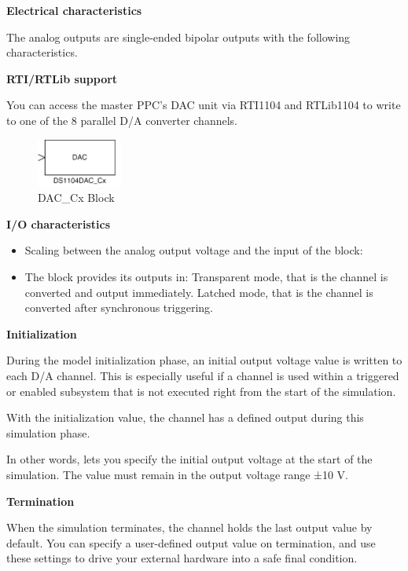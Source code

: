 \noindent \textbf{Electrical characteristics}\par
The analog outputs are single-ended bipolar outputs with the following characteristics.


\noindent \textbf{RTI/RTLib support}\par
You can access the master PPC’s DAC unit via RTI1104 and RTLib1104 to write to one of the 8 parallel D/A converter channels.\\
\begin{figure}[H]
    \centering
    \includegraphics[width=0.25\textwidth]{Images/DS1104MUX_DAC.png}
    \caption{DAC\_Cx Block}
    \label{DAC_Cx}
\end{figure}

\noindent \textbf{I/O characteristics}\par
\begin{itemize}
    \item Scaling between the analog output voltage and the input of the block:
    
    \item The block provides its outputs in:
    \subitem Transparent mode, that is the channel is converted and output immediately.
    \subitem Latched mode, that is the channel is converted after synchronous triggering.
\end{itemize}

\noindent \textbf{Initialization}\par
During the model initialization phase, an initial output voltage value is written to each D/A channel. This is especially useful if a channel is used within a triggered or enabled subsystem that is not executed right from the start of the simulation.

With the initialization value, the channel has a defined output during this simulation phase.

In other words, lets you specify the initial output voltage at the start of the simulation. The value must remain in the output voltage range ±10 V.

\noindent \textbf{Termination}\par
When the simulation terminates, the channel holds the last output value by default. You can specify a user-defined output value on termination, and use these settings to drive your external hardware into a safe final condition.

